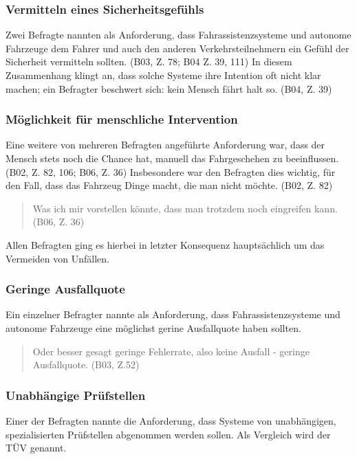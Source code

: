 \documentclass[12pt]{article}
\begin{document}
\subsubsection*{Vermitteln eines Sicherheitsgefühls}
Zwei Befragte nannten als Anforderung, dass Fahrassistenzsysteme und autonome Fahrzeuge dem Fahrer und auch den anderen Verkehrsteilnehmern ein Gefühl der Sicherheit vermitteln sollten. (B03, Z. 78; B04 Z. 39, 111) In diesem Zusammenhang klingt an, dass solche Systeme ihre Intention oft nicht klar machen; ein Befragter beschwert sich: \glqq kein Mensch fährt halt so\grqq{}. (B04, Z. 39)

\subsubsection*{Möglichkeit für menschliche Intervention}
Eine weitere von mehreren Befragten angeführte Anforderung war, dass der Mensch stets noch die Chance hat, manuell das Fahrgeschehen zu beeinflussen. (B02, Z. 82, 106; B06, Z. 36) Insbesondere war den Befragten dies wichtig, für den Fall, dass \glqq das Fahrzeug Dinge macht, die man nicht möchte\grqq{}. (B02, Z. 82)

\begin{quote}
  Was ich mir vorstellen könnte, dass man trotzdem noch eingreifen kann. (B06, Z. 36)
\end{quote}

Allen Befragten ging es hierbei in letzter Konsequenz hauptsächlich um das Vermeiden von Unfällen.

\subsubsection*{Geringe Ausfallquote}
Ein einzelner Befragter nannte als Anforderung, dass Fahrassistenzsysteme und autonome Fahrzeuge eine möglichst gerine Ausfallquote haben sollten.

\begin{quote}
  Oder besser gesagt geringe Fehlerrate, also keine Ausfall - geringe Ausfallquote. (B03, Z.52)
\end{quote}

\subsubsection*{Unabhängige Prüfstellen}
Einer der Befragten nannte die Anforderung, dass Systeme von unabhängigen, spezialisierten Prüfstellen abgenommen werden sollen. Als Vergleich wird der TÜV genannt.
\end{document}
